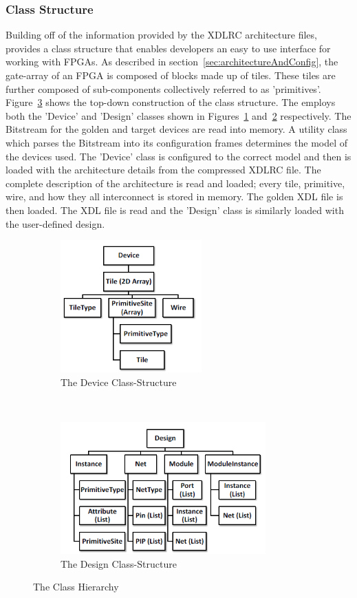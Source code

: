 \subsubsection{Class Structure} \label{sec:classStructure}
Building off of the information provided by the XDLRC architecture files, \RapidSmith provides a class structure that enables developers an easy to use interface for working with \acrshort{FPGA}s.
As described in section~\ref{sec:architectureAndConfig}, the gate-array of an \acrshort{FPGA} is composed of blocks made up of tiles.
These tiles are further composed of sub-components collectively referred to as 'primitives'.
Figure~\ref{fig:classStructures} shows the top-down construction of the \RapidSmith class structure.
The \NameNoPeriod employs both the 'Device' and 'Design' classes shown in Figures~\ref{fig:rapidSmithDevice} and~\ref{fig:rapidSmithDesign} respectively.
The \gls{Bitstream} for the \gls{golden} and \gls{target} devices are read into memory. 
A utility class which parses the \gls{Bitstream} into its configuration frames determines the model of the devices used.
The 'Device' class is configured to the correct model and then is loaded with the architecture details from the compressed XDLRC file.
The complete description of the architecture is read and loaded; every tile, primitive, wire, and how they all interconnect is stored in memory.
The \gls{golden} \acrshort{XDL} file is then loaded.
The \acrshort{XDL} file is read and the 'Design' class is similarly loaded with the user-defined design.
\begin{figure}[h]
	\centering
	\begin{subfigure}[t]{0.5\textwidth}
			\centering
			\includegraphics[height=2in]{Figures/rapidSmithDevice}
			\caption{The Device Class-Structure}
			\label{fig:rapidSmithDevice}
	\end{subfigure}%
	~ 
	\begin{subfigure}[t]{0.5\textwidth}
		\centering
		\includegraphics[height=2in]{Figures/rapidSmithDesign}
		\caption{The Design Class-Structure}
		 \label{fig:rapidSmithDesign}
	\end{subfigure}
	\caption{The \RapidSmith Class Hierarchy~\cite{rapidSmithManual}}
	 \label{fig:classStructures}
\end{figure}
